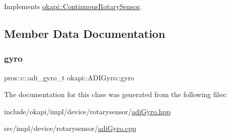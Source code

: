 Implements \mbox{\hyperlink{classokapi_1_1ContinuousRotarySensor_ae7268b0603097ac2d93a67e4fefa43e0}{okapi\+::\+Continuous\+Rotary\+Sensor}}.



\subsection{Member Data Documentation}
\mbox{\label{classokapi_1_1ADIGyro_a2ad9717b3e55a829467d9e696de252ac}} 
\subsubsection{\texorpdfstring{gyro}{gyro}}
{\footnotesize\ttfamily pros\+::c\+::adi\+\_\+gyro\+\_\+t okapi\+::\+A\+D\+I\+Gyro\+::gyro\hspace{0.3cm}{\ttfamily [protected]}}



The documentation for this class was generated from the following files\+:\begin{DoxyCompactItemize}
\item 
include/okapi/impl/device/rotarysensor/\mbox{\hyperlink{adiGyro_8hpp}{adi\+Gyro.\+hpp}}\item 
src/impl/device/rotarysensor/\mbox{\hyperlink{adiGyro_8cpp}{adi\+Gyro.\+cpp}}\end{DoxyCompactItemize}
